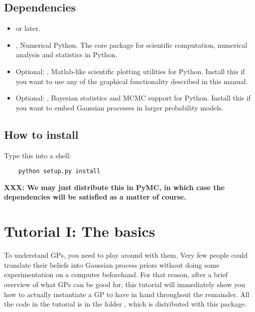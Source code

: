 \documentclass{manual}
\begin{document}
\section{Dependencies}
\begin{itemize}
	\item {} or later.
	\item {}, Numerical Python. The core package for scientific computation, numerical analysis and statistics in Python.
	\item Optional: , Matlab-like scientific plotting utilities for Python. Install this if you want to use any of the graphical functionality described in this manual.
	\item Optional: , Bayesian statistics and MCMC support for Python. Install this if you want to embed Gaussian processes in larger probability models.
\end{itemize} 

\section{How to install}\label{sec:installing}

Type this into a shell:
\begin{verbatim}
	python setup.py install
\end{verbatim}
\textbf{XXX: We may just distribute this in PyMC, in which case the dependencies will be satisfied as a matter of course.}




\chapter{Tutorial I: The basics}\label{cha:basics} %


To understand GPs, you need to play around with them. Very few people could translate their beliefs into Gaussian process priors without doing some experimentation on a computer beforehand. For that reason, after a brief overview of what GPs can be good for, this tutorial will immediately show you how to actually instantiate a GP to have in hand throughout the remainder. All the code in the tutorial is in the folder , which is distributed with this package.
\end{document}
